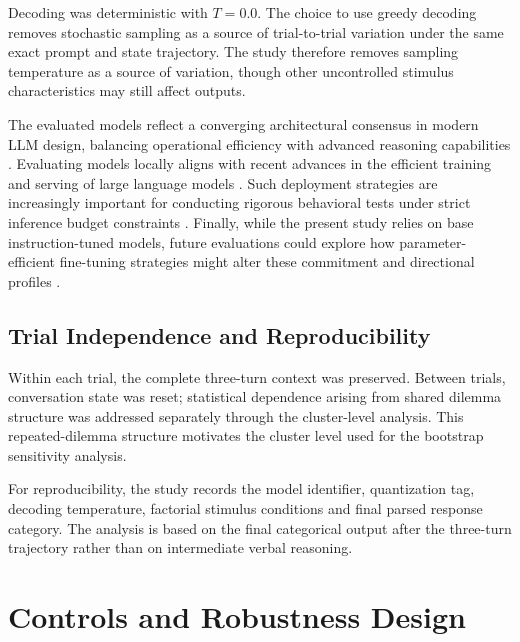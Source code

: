\documentclass[10pt,journal,compsoc]{IEEEtran}
\begin{document}
Decoding was deterministic with $T=0.0$. The choice to use greedy decoding removes stochastic sampling as a source of trial-to-trial variation under the same exact prompt and state trajectory. The study therefore removes sampling temperature as a source of variation, though other uncontrolled stimulus characteristics may still affect outputs.

The evaluated models reflect a converging architectural consensus in modern LLM design, balancing operational efficiency with advanced reasoning capabilities \cite{ojcs_architecture_2025}. Evaluating models locally aligns with recent advances in the efficient training and serving of large language models \cite{ojcs_training_serving_2024}. Such deployment strategies are increasingly important for conducting rigorous behavioral tests under strict inference budget constraints \cite{ojcs_budget_2025}. Finally, while the present study relies on base instruction-tuned models, future evaluations could explore how parameter-efficient fine-tuning strategies might alter these commitment and directional profiles \cite{ojcs_finetune_2026}.

\subsection{Trial Independence and Reproducibility}
Within each trial, the complete three-turn context was preserved.
Between trials, conversation state was reset; statistical dependence
arising from shared dilemma structure was addressed separately
through the cluster-level analysis. This repeated-dilemma structure
motivates the cluster level used for the bootstrap sensitivity analysis.

For reproducibility, the study records the model identifier, quantization tag, decoding temperature, factorial stimulus conditions and final parsed response category. The analysis is based on the final categorical output after the three-turn trajectory rather than on intermediate verbal reasoning.

\section{Controls and Robustness Design}
\label{sec:controls}
\end{document}
